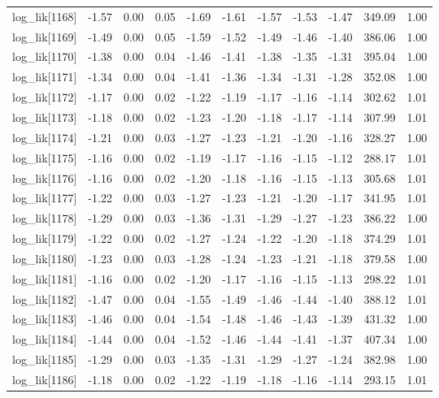 \begin{table}[ht]
\begin{tabular}{rrrrrrrrrrr}
  log\_lik[1168] & -1.57 & 0.00 & 0.05 & -1.69 & -1.61 & -1.57 & -1.53 & -1.47 & 349.09 & 1.00 \\ 
  log\_lik[1169] & -1.49 & 0.00 & 0.05 & -1.59 & -1.52 & -1.49 & -1.46 & -1.40 & 386.06 & 1.00 \\ 
  log\_lik[1170] & -1.38 & 0.00 & 0.04 & -1.46 & -1.41 & -1.38 & -1.35 & -1.31 & 395.04 & 1.00 \\ 
  log\_lik[1171] & -1.34 & 0.00 & 0.04 & -1.41 & -1.36 & -1.34 & -1.31 & -1.28 & 352.08 & 1.00 \\ 
  log\_lik[1172] & -1.17 & 0.00 & 0.02 & -1.22 & -1.19 & -1.17 & -1.16 & -1.14 & 302.62 & 1.01 \\ 
  log\_lik[1173] & -1.18 & 0.00 & 0.02 & -1.23 & -1.20 & -1.18 & -1.17 & -1.14 & 307.99 & 1.01 \\ 
  log\_lik[1174] & -1.21 & 0.00 & 0.03 & -1.27 & -1.23 & -1.21 & -1.20 & -1.16 & 328.27 & 1.00 \\ 
  log\_lik[1175] & -1.16 & 0.00 & 0.02 & -1.19 & -1.17 & -1.16 & -1.15 & -1.12 & 288.17 & 1.01 \\ 
  log\_lik[1176] & -1.16 & 0.00 & 0.02 & -1.20 & -1.18 & -1.16 & -1.15 & -1.13 & 305.68 & 1.01 \\ 
  log\_lik[1177] & -1.22 & 0.00 & 0.03 & -1.27 & -1.23 & -1.21 & -1.20 & -1.17 & 341.95 & 1.01 \\ 
  log\_lik[1178] & -1.29 & 0.00 & 0.03 & -1.36 & -1.31 & -1.29 & -1.27 & -1.23 & 386.22 & 1.00 \\ 
  log\_lik[1179] & -1.22 & 0.00 & 0.02 & -1.27 & -1.24 & -1.22 & -1.20 & -1.18 & 374.29 & 1.01 \\ 
  log\_lik[1180] & -1.23 & 0.00 & 0.03 & -1.28 & -1.24 & -1.23 & -1.21 & -1.18 & 379.58 & 1.00 \\ 
  log\_lik[1181] & -1.16 & 0.00 & 0.02 & -1.20 & -1.17 & -1.16 & -1.15 & -1.13 & 298.22 & 1.01 \\ 
  log\_lik[1182] & -1.47 & 0.00 & 0.04 & -1.55 & -1.49 & -1.46 & -1.44 & -1.40 & 388.12 & 1.01 \\ 
  log\_lik[1183] & -1.46 & 0.00 & 0.04 & -1.54 & -1.48 & -1.46 & -1.43 & -1.39 & 431.32 & 1.00 \\ 
  log\_lik[1184] & -1.44 & 0.00 & 0.04 & -1.52 & -1.46 & -1.44 & -1.41 & -1.37 & 407.34 & 1.00 \\ 
  log\_lik[1185] & -1.29 & 0.00 & 0.03 & -1.35 & -1.31 & -1.29 & -1.27 & -1.24 & 382.98 & 1.00 \\ 
  log\_lik[1186] & -1.18 & 0.00 & 0.02 & -1.22 & -1.19 & -1.18 & -1.16 & -1.14 & 293.15 & 1.01 \\ 

\end{tabular}
\end{table}
